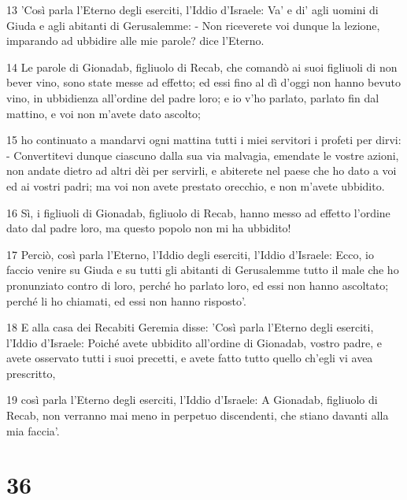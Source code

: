 \par 13 'Così parla l'Eterno degli eserciti, l'Iddio d'Israele: Va' e di' agli uomini di Giuda e agli abitanti di Gerusalemme: - Non riceverete voi dunque la lezione, imparando ad ubbidire alle mie parole? dice l'Eterno.
\par 14 Le parole di Gionadab, figliuolo di Recab, che comandò ai suoi figliuoli di non bever vino, sono state messe ad effetto; ed essi fino al dì d'oggi non hanno bevuto vino, in ubbidienza all'ordine del padre loro; e io v'ho parlato, parlato fin dal mattino, e voi non m'avete dato ascolto;
\par 15 ho continuato a mandarvi ogni mattina tutti i miei servitori i profeti per dirvi: - Convertitevi dunque ciascuno dalla sua via malvagia, emendate le vostre azioni, non andate dietro ad altri dèi per servirli, e abiterete nel paese che ho dato a voi ed ai vostri padri; ma voi non avete prestato orecchio, e non m'avete ubbidito.
\par 16 Sì, i figliuoli di Gionadab, figliuolo di Recab, hanno messo ad effetto l'ordine dato dal padre loro, ma questo popolo non mi ha ubbidito!
\par 17 Perciò, così parla l'Eterno, l'Iddio degli eserciti, l'Iddio d'Israele: Ecco, io faccio venire su Giuda e su tutti gli abitanti di Gerusalemme tutto il male che ho pronunziato contro di loro, perché ho parlato loro, ed essi non hanno ascoltato; perché li ho chiamati, ed essi non hanno risposto'.
\par 18 E alla casa dei Recabiti Geremia disse: 'Così parla l'Eterno degli eserciti, l'Iddio d'Israele: Poiché avete ubbidito all'ordine di Gionadab, vostro padre, e avete osservato tutti i suoi precetti, e avete fatto tutto quello ch'egli vi avea prescritto,
\par 19 così parla l'Eterno degli eserciti, l'Iddio d'Israele: A Gionadab, figliuolo di Recab, non verranno mai meno in perpetuo discendenti, che stiano davanti alla mia faccia'.

\chapter{36}

